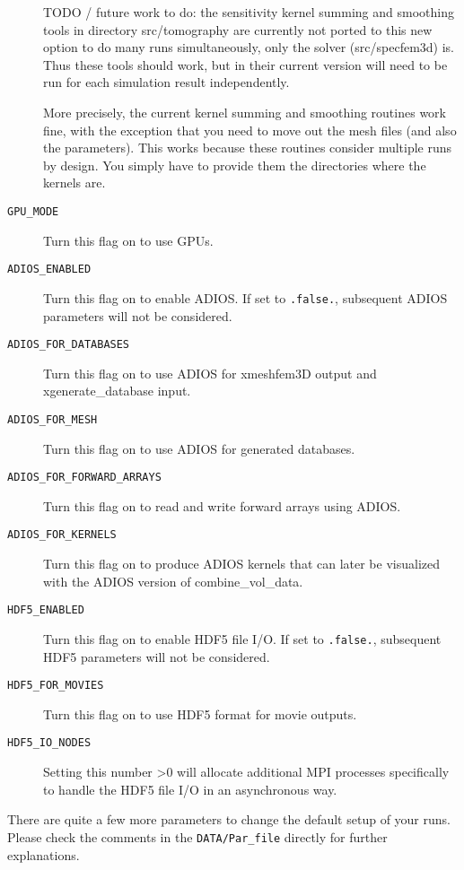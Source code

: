 \begin{description}
TODO / future work to do: the sensitivity kernel summing and smoothing tools in directory src/tomography are currently not ported to this new option to do many runs simultaneously, only the solver (src/specfem3d) is. Thus these tools should work, but in their current version will need to be run for each simulation result independently.\newline

More precisely, the current kernel summing and smoothing routines work fine, with the exception that you need to move out the mesh files (and also the parameters). This works because these routines consider multiple runs by design. You simply have to provide them the directories where the kernels are.\newline

\item [{\texttt{GPU\_MODE}}] Turn this flag on to use GPUs.

\item [\texttt{ADIOS\_ENABLED}] Turn this flag on to enable ADIOS. If set to \texttt{.false.}, subsequent ADIOS
parameters will not be considered.
\item [\texttt{ADIOS\_FOR\_DATABASES}] Turn this flag on to use ADIOS for xmeshfem3D output and
xgenerate\_database input.
\item [\texttt{ADIOS\_FOR\_MESH}]  Turn this flag on to use ADIOS for generated databases.
\item [\texttt{ADIOS\_FOR\_FORWARD\_ARRAYS}] Turn this flag on to read and write forward arrays using ADIOS.
\item [\texttt{ADIOS\_FOR\_KERNELS}] Turn this flag on to produce ADIOS kernels that can later be visualized with the ADIOS version of combine\_vol\_data.

\item [\texttt{HDF5\_ENABLED}] Turn this flag on to enable HDF5 file I/O. If set to \texttt{.false.}, subsequent HDF5
parameters will not be considered.
\item [\texttt{HDF5\_FOR\_MOVIES}] Turn this flag on to use HDF5 format for movie outputs.
\item [\texttt{HDF5\_IO\_NODES}] Setting this number >0 will allocate additional MPI processes specifically to handle
the HDF5 file I/O in an asynchronous way.

\end{description}
There are quite a few more parameters to change the default setup of your runs. Please check the comments in the \texttt{DATA/Par\_file} directly for further explanations.\newline



